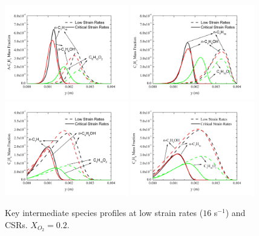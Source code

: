 \documentclass[review,3p,times]{elsarticleUS}
\begin{document}
\begin{figure}[ht]
  \centering
  \scriptsize
  \includegraphics[trim=4mm 8mm 30mm 20mm, clip=true, width=0.48\textwidth]{A-C3H5-y.png}
  \includegraphics[trim=4mm 8mm 30mm 20mm, clip=true, width=0.48\textwidth]{C3H3-y.png}
  \includegraphics[trim=4mm 8mm 30mm 20mm, clip=true, width=0.48\textwidth]{C5H6-y.png}
  \includegraphics[trim=4mm 8mm 30mm 20mm, clip=true, width=0.48\textwidth]{A1-y.png}
  \normalsize
  \vspace{-0.1in}
  \caption{Key intermediate species profiles at low strain rates ($16$ s$^{-1}$) and CSRs. $X_{O_2}=0.2$.}
  \label{fig:CxHy}
\end{figure}
\end{document}
